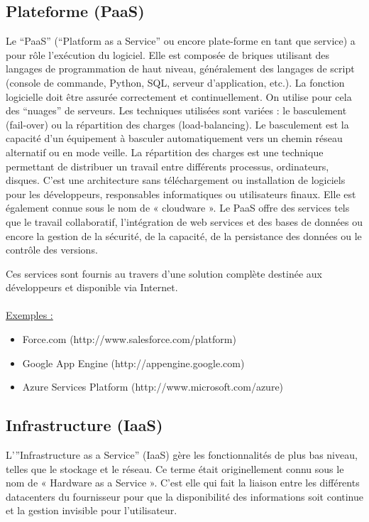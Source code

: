 \documentclass[a4paper,12pt]{report}
\begin{document}
\begin{onehalfspace}
	\subsection{Plateforme (PaaS)}
	Le “PaaS” (“Platform as a Service” ou encore plate-forme en tant que service) a pour rôle l’exécution du logiciel. Elle est composée de briques utilisant des langages de programmation de haut niveau, généralement des langages de script (console de commande, Python, SQL, serveur d'application, etc.). La fonction logicielle doit être assurée correctement et continuellement. On utilise pour cela des “nuages” de serveurs. Les techniques utilisées sont variées : le basculement (fail-over) ou la répartition des charges (load-balancing). Le basculement est la capacité d’un équipement à basculer automatiquement vers un chemin réseau alternatif ou en mode veille. La répartition des charges est une technique permettant de distribuer un travail entre différents processus, ordinateurs, disques. C'est une architecture sans téléchargement ou installation de logiciels pour les développeurs, responsables informatiques ou utilisateurs finaux. Elle est également connue sous le nom de « cloudware ». Le PaaS offre des services tels que le travail collaboratif, l’intégration de web services et des bases de données ou encore la gestion de la sécurité, de la capacité, de la persistance des données ou le contrôle des versions.
	
	Ces services sont fournis au travers d’une solution complète destinée aux développeurs et disponible via Internet.
	
	\paragraph*{}
	\underline{Exemples :}
	\begin{itemize}
		\item Force.com (http://www.salesforce.com/platform)
		\item Google App Engine (http://appengine.google.com)
		\item Azure Services Platform (http://www.microsoft.com/azure)
	\end{itemize}
	
	\subsection{Infrastructure (IaaS)}
	L’”Infrastructure as a Service” (IaaS) gère les fonctionnalités de plus bas niveau, telles que le stockage et le réseau. Ce terme était originellement connu sous le nom de « Hardware as a Service ». C’est elle qui fait la liaison entre les différents datacenters du fournisseur pour que la disponibilité des informations soit continue et la gestion invisible pour l’utilisateur.
	

\end{onehalfspace}
\end{document}
